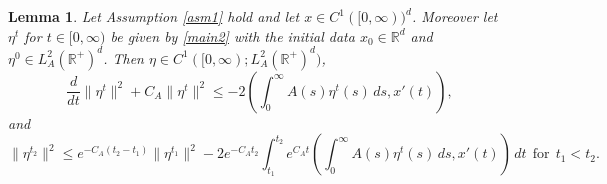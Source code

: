 \documentclass[11pt, leqno]{amsart}
\newtheorem{lem}[thm]{Lemma}
\theoremstyle{definition}
\def\R{\mathbb{R}}
\begin{document}
\begin{lem}\label{lem:eta}
	Let Assumption \ref{asm1} hold and let $x\in  C^1([0,\infty))^d$. Moreover let $\eta^t$ for $t\in [0,\infty)$ be given by  \eqref{main2} with the initial data  $x_0\in \mathbb{R}^d$ and $\eta^0\in L^2_A(\mathbb{R}^+)^d$. Then $\eta\in C^1([0,\infty);L^2_A(\R^+)^d)$,
	\begin{equation}\label{eq:1}
		\frac{d}{d t}\|\eta^t\|^2  + C_A\|\eta^t\|^2 \leq  - 2\left(\int_0^\infty A(s)\eta^t(s)\, ds,x'(t)\right),
	\end{equation}
	and
	\begin{equation}\label{eq:2}
		\|\eta^{t_2}\|^2 \leq e^{-C_A(t_2-t_1)}\|\eta^{t_1}\|^2 - 2 e^{-C_At_2} \int_{t_1}^{t_2}e^{C_At}\left(\int_0^\infty A(s)\eta^t(s)\, ds,x'(t)\right) \, dt\ \ \textrm{for} \ \ t_1< t_2.
	\end{equation}
\end{lem}
\end{document}
